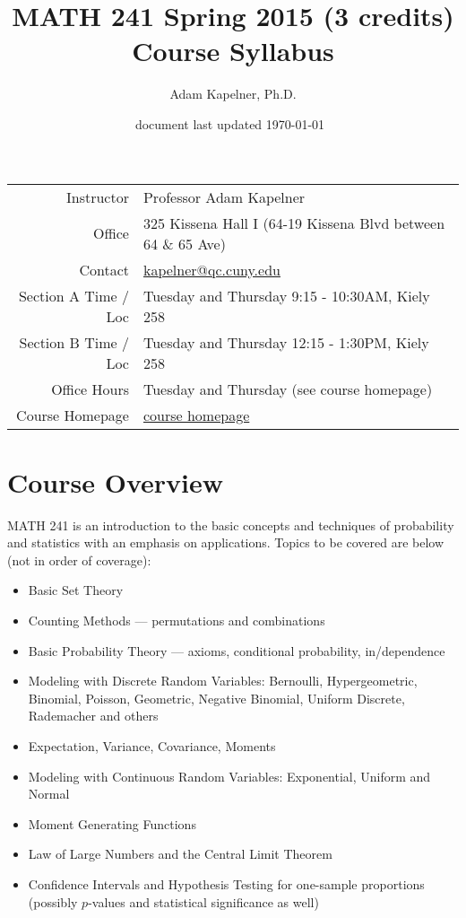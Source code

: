 \documentclass[12pt]{article}
\title{MATH 241 Spring 2015 (3 credits) \\ Course Syllabus}
\author[]{Adam Kapelner, Ph.D.}
\affil[]{Queens College, City University of New York}
\date{\small document last updated \today ~\currenttime }
\newcommand{\coursewebpage}{\href{https://github.com/kapelner/QC_Math_241_Spring_2015}{course homepage}}
\begin{document}
\maketitle

\begin{table}[htp]
\centering
\begin{tabular}{rl}
Instructor & Professor Adam Kapelner \\
Office & 325 Kissena Hall I (64-19 Kissena Blvd between 64 \& 65 Ave) \\
Contact & \url{kapelner@qc.cuny.edu} \\
Section A Time / Loc & Tuesday and Thursday 9:15 - 10:30AM, Kiely 258 \\
Section B Time / Loc & Tuesday and Thursday 12:15 - 1:30PM, Kiely 258 \\
Office Hours & Tuesday and Thursday (see course homepage) \\
Course Homepage & \coursewebpage
\end{tabular}
\end{table}

\section*{Course Overview}

MATH 241 is an introduction to the basic concepts and techniques of probability and statistics with an emphasis on applications. Topics to be covered are below (not in order of coverage):

\begin{itemize}
\itemsep -0.0em 
\item Basic Set Theory
\item Counting Methods --- permutations and combinations
\item Basic Probability Theory --- axioms, conditional probability, in/dependence
\item Modeling with Discrete Random Variables: Bernoulli, Hypergeometric, Binomial, Poisson, Geometric, Negative Binomial, Uniform Discrete, Rademacher and others
\item Expectation, Variance, Covariance, Moments
\item Modeling with Continuous Random Variables: Exponential, Uniform and Normal
\item Moment Generating Functions
\item Law of Large Numbers and the Central Limit Theorem
\item Confidence Intervals and Hypothesis Testing for one-sample proportions (possibly $p$-values and statistical significance as well)
\end{itemize}
\end{document}
